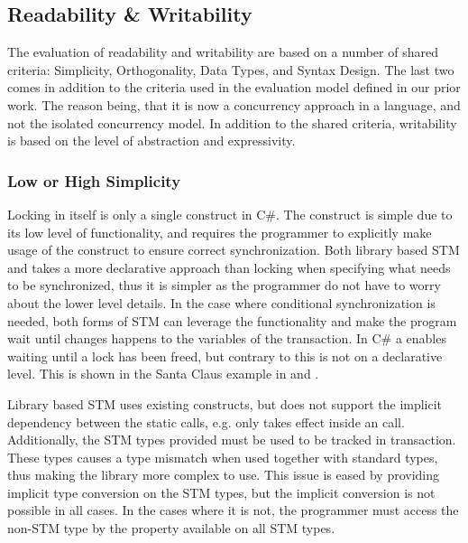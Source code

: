 \subsection{Readability \& Writability}\label{subsec:tl_charac_read_and_write}
The evaluation of readability and writability are based on a number of shared criteria: Simplicity, Orthogonality, Data Types, and Syntax Design. The last two comes in addition to the criteria used in the evaluation model defined in our prior work\cite[p. 16-21]{dpt907e14trending}. The reason being, that it is now a concurrency approach in a language, and not the isolated concurrency model. In addition to the shared criteria, writability is based on the level of abstraction and expressivity.
\subsubsection{Low or High Simplicity}\label{subsec:simplicity}
Locking in itself is only a single construct in C\#. The construct is simple due to its low level of functionality, and requires the programmer to explicitly make usage of the construct to ensure correct synchronization. Both library based \ac{STM} and \stmname takes a more declarative approach than locking when specifying what needs to be synchronized, thus it is simpler as the programmer do not have to worry about the lower level details. In the case where conditional synchronization is needed, both forms of \ac{STM} can leverage the  functionality and make the program wait until changes happens to the variables of the transaction. In C\# a  enables waiting until a lock has been freed, but contrary to  this is not on a declarative level. This is shown in the Santa Claus example in  and .

Library based \ac{STM} uses existing constructs, but does not support the implicit dependency between the static calls, e.g.  only takes effect inside an  call. Additionally, the \ac{STM} types provided must be used to be tracked in transaction. These types causes a type mismatch when used together with standard types, thus making the library more complex to use. This issue is eased by providing implicit type conversion on the \ac{STM} types, but the implicit conversion is not possible in all cases. In the cases where it is not, the programmer must access the non-\ac{STM} type by the  property available on all \ac{STM} types. 

